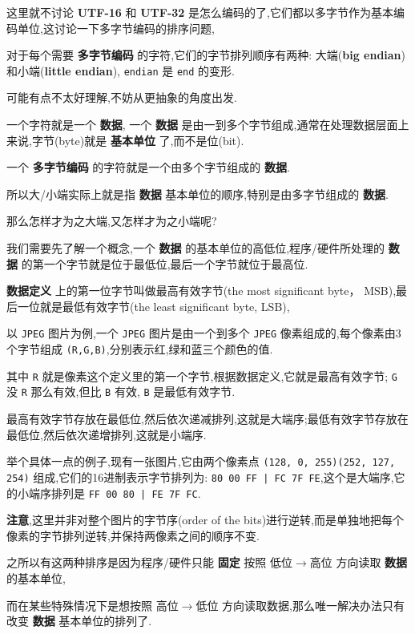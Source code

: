\documentclass[11pt]{article}
\begin{document}
这里就不讨论 \textbf{UTF-16} 和 \textbf{UTF-32} 是怎么编码的了,它们都以多字节作为基本编码单位,这讨论一下多字节编码的排序问题,

对于每个需要 \textbf{多字节编码} 的字符,它们的字节排列顺序有两种: 大端(\textbf{big endian})和小端(\textbf{little endian}), \texttt{endian} 是 \texttt{end} 的变形.

可能有点不太好理解,不妨从更抽象的角度出发.

一个字符就是一个 \textbf{数据}, 一个 \textbf{数据} 是由一到多个字节组成,通常在处理数据层面上来说,字节(byte)就是 \textbf{基本单位} 了,而不是位(bit).

一个 \textbf{多字节编码} 的字符就是一个由多个字节组成的 \textbf{数据}.

所以大/小端实际上就是指 \textbf{数据} 基本单位的顺序,特别是由多字节组成的 \textbf{数据}.

那么怎样才为之大端,又怎样才为之小端呢?

我们需要先了解一个概念,一个 \textbf{数据} 的基本单位的高低位,程序/硬件所处理的 \textbf{数据} 的第一个字节就是位于最低位,最后一个字节就位于最高位.

\textbf{数据定义} 上的第一位字节叫做最高有效字节(the most significant byte， MSB),最后一位就是最低有效字节(the least significant byte, LSB),

以 \texttt{JPEG} 图片为例,一个 \texttt{JPEG} 图片是由一个到多个 \texttt{JPEG} 像素组成的,每个像素由3个字节组成 \texttt{(R,G,B)},分别表示红,绿和蓝三个颜色的值.

其中 \texttt{R} 就是像素这个定义里的第一个字节,根据数据定义,它就是最高有效字节; \texttt{G} 没 \texttt{R} 那么有效,但比 \texttt{B} 有效, \texttt{B} 是最低有效字节.

最高有效字节存放在最低位,然后依次递减排列,这就是大端序;最低有效字节存放在最低位,然后依次递增排列,这就是小端序.

举个具体一点的例子,现有一张图片,它由两个像素点 \texttt{(128, 0, 255)(252, 127, 254)} 组成,它们的16进制表示字节排列为: \texttt{80 00 FF | FC 7F FE},这个是大端序,它的小端序排列是 \texttt{FF 00 80 | FE 7F FC}.

\textbf{注意},这里并非对整个图片的字节序(order of the bits)进行逆转,而是单独地把每个像素的字节排列逆转,并保持两像素之间的顺序不变.

之所以有这两种排序是因为程序/硬件只能 \textbf{固定} 按照 \(低位 \longrightarrow 高位\) 方向读取 \textbf{数据} 的基本单位,

而在某些特殊情况下是想按照 \(高位 \longrightarrow 低位\) 方向读取数据,那么唯一解决办法只有改变 \textbf{数据} 基本单位的排列了.
\end{document}
